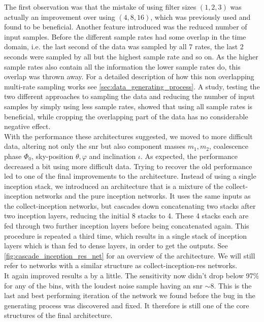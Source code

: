 The first observation was that the mistake of using filter sizes $(1,2,3)$ was actually an improvement over using $(4,8,16)$, which was previously used and found to be beneficial.
 Another feature introduced was the reduced number of input samples. Before the different sample rates had some overlap in the time domain, i.e. the last second of the data was sampled by all 7 rates, the last 2 seconds were sampled by all but the highest sample rate and so on. As the higher sample rates also contain all the information the lower sample rates do, this overlap was thrown away. For a detailed description of how this non overlapping multi-rate sampling works see \autoref{sec:data_generating_process}. A study, testing the two different approaches to sampling the data and reducing the number of input samples by simply using less sample rates, showed that using all sample rates is beneficial, while cropping the overlapping part of the data has no considerable negative effect.\\
With the performance these architectures suggested, we moved to more difficult data, altering not only the \gls{snr} but also component masses $m_1, m_2$, coalescence phase $\Phi_0$, sky-position $\theta, \varphi$ and inclination $\iota$. As expected, the performance decreased a bit using more difficult data. Trying to recover the old performance led to one of the final improvements to the architecture. Instead of using a single inception stack, we introduced an architecture that is a mixture of the collect-inception networks and the pure inception networks. It uses the same inputs as the collect-inception networks, but cascades down concatenating two stacks after two inception layers, reducing the initial 8 stacks to 4. These 4 stacks each are fed through two further inception layers before being concatenated again. This procedure is repeated a third time, which results in a single stack of inception layers which is than fed to dense layers, in order to get the outputs. See \autoref{fig:cascade_inception_res_net} for an overview of the architecture. We will still refer to networks with a similar structure as collect-inception-res networks.\\
It again improved results a by a little. The sensitivity now didn't drop below 97\% for any of the bins, with the loudest noise sample having an \gls{snr} $\sim 8$. This is the last and best performing iteration of the network we found before the bug in the generating process was discovered and fixed. It therefore is still one of the core structures of the final architecture.\medskip\\
